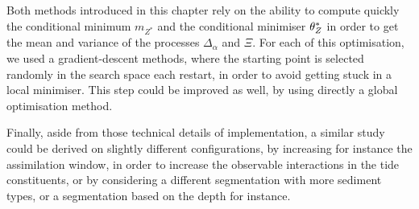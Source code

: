 \documentclass[../../Main_ManuscritThese.tex]{subfiles}
\begin{document}
Both methods introduced in this chapter rely on the ability to compute
quickly the conditional minimum $m_{Z^*}$ and the conditional
minimiser $\theta_Z^*$ in order to get the mean and variance of the
processes $\Delta_\alpha$ and $\Xi$. For each of this optimisation, we
used a gradient-descent methods, where the starting point is selected
randomly in the search space each restart, in order to avoid getting
stuck in a local minimiser. This step could be improved as well, by
using directly a global optimisation
method.%

Finally, aside from those technical details of implementation, a
similar study could be derived on slightly different configurations,
by increasing for instance the assimilation window, in order to
increase the observable interactions in the tide constituents, or by
considering a different segmentation with more sediment types, or a
segmentation based on the depth for instance.

\markchapterend


\subfileLocal{
	\pagestyle{empty}
	
	
}
\end{document}
